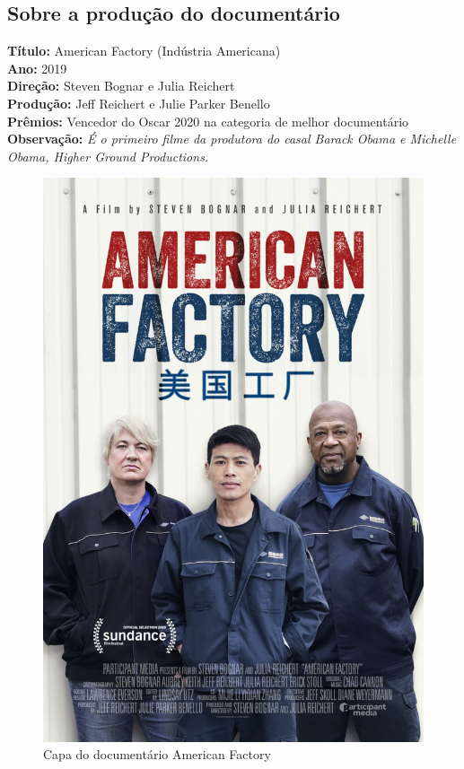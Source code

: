 \documentclass[12pt,a4paper,oneside]{article}
\begin{document}
\begin{onehalfspace}

\section{Sobre a produção do documentário}

\textbf{Título:} American Factory (Indústria Americana)\\
\textbf{Ano:} 2019 \\
\textbf{Direção:} Steven Bognar e Julia Reichert \\
\textbf{Produção:} Jeff Reichert e Julie Parker Benello \\
\textbf{Prêmios:} Vencedor do Oscar 2020 na categoria de melhor documentário \\
\textbf{Observação:}  \textit{É o primeiro filme da produtora do casal Barack Obama e Michelle Obama, Higher Ground Productions.
}

\begin{figure} [H]
\centering
\includegraphics[scale=0.3]{Fig/AmericanFactory.jpg} 
\caption{Capa do documentário American Factory}
\label{fig:MapGrandNaveg}
\end{figure}


\end{onehalfspace}
\end{document}
